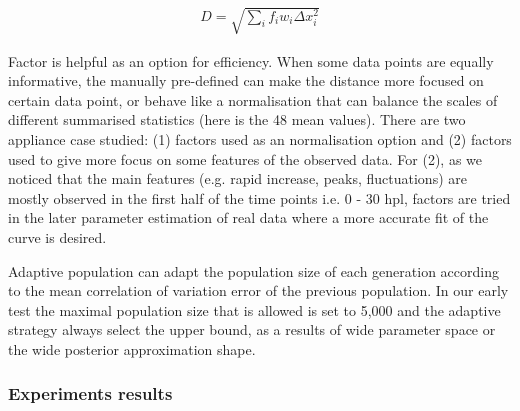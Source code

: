 \begin{align}
    \label{dis_f}
    D=\sqrt{\sum_i f_iw_i \Delta x_i^2}
\end{align}

Factor is helpful as an option for efficiency. When some data points are equally informative, the manually pre-defined can make the distance more focused on certain data point, or behave like a normalisation that can balance the scales of different summarised statistics (here is the 48 mean values). There are two appliance case studied: (1) factors used as an normalisation option and (2) factors used to give more focus on some features of the observed data. For (2), as we noticed that the main features (e.g. rapid increase, peaks, fluctuations) are mostly observed in the first half of the time points i.e. 0 - 30 hpl, factors are tried in the later parameter estimation of real data where a more accurate fit of the curve is desired.

Adaptive population \cite{population} can adapt the population size of each generation according to the mean correlation of variation error of the previous population. In our early test the maximal population size that is allowed is set to 5,000 and the adaptive strategy always select the upper bound, as a results of wide parameter space or the wide posterior approximation shape.



\subsubsection{Experiments results}



